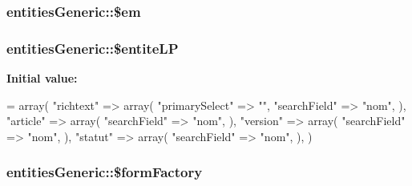 \hypertarget{classentities_generic_abebd97c4df0dd33a446324ca04fe8f00}{
\subsubsection[{\$em}]{\setlength{\rightskip}{0pt plus 5cm}entities\+Generic\+::\$em\hspace{0.3cm}{\ttfamily [protected]}}}\label{classentities_generic_abebd97c4df0dd33a446324ca04fe8f00}
\hypertarget{classentities_generic_a2d864cbd0b9578a77412752e1132d050}{
\subsubsection[{\$entite\+L\+P}]{\setlength{\rightskip}{0pt plus 5cm}entities\+Generic\+::\$entite\+L\+P\hspace{0.3cm}{\ttfamily [protected]}}}\label{classentities_generic_a2d864cbd0b9578a77412752e1132d050}
{\bfseries Initial value\+:}
\begin{DoxyCode}
= array(            
        \textcolor{stringliteral}{"richtext"} => array(
            \textcolor{stringliteral}{"primarySelect"} => \textcolor{stringliteral}{""},
            \textcolor{stringliteral}{"searchField"}   => \textcolor{stringliteral}{"nom"},
            ),
        \textcolor{stringliteral}{"article"} => array(
            \textcolor{stringliteral}{"searchField"}   => \textcolor{stringliteral}{"nom"},
            ),
        \textcolor{stringliteral}{"version"} => array(
            \textcolor{stringliteral}{"searchField"}   => \textcolor{stringliteral}{"nom"},
            ),
        \textcolor{stringliteral}{"statut"} => array(
            \textcolor{stringliteral}{"searchField"}   => \textcolor{stringliteral}{"nom"},
            ),
        )
\end{DoxyCode}
\hypertarget{classentities_generic_a9748f7409413dfe0ce6d3a9611f435f0}{
\subsubsection[{\$form\+Factory}]{\setlength{\rightskip}{0pt plus 5cm}entities\+Generic\+::\$form\+Factory\hspace{0.3cm}{\ttfamily [protected]}}}\label{classentities_generic_a9748f7409413dfe0ce6d3a9611f435f0}
